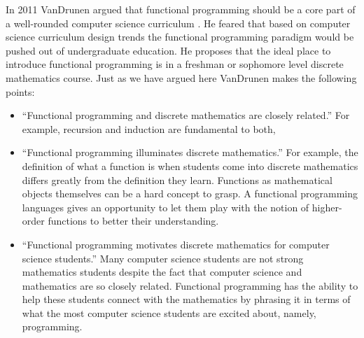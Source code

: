 In 2011 VanDrunen argued that functional programming should be a core
part of a well-rounded computer science curriculum
\cite{VanDrunen:2011}.  He feared that based on computer science
curriculum design trends the functional programming paradigm would be
pushed out of undergraduate education. He proposes that the ideal
place to introduce functional programming is in a freshman or
sophomore level discrete mathematics course.  Just as we have argued
here VanDrunen makes the following points:
\begin{itemize}
\item ``Functional programming and discrete mathematics are closely
  related.''  For example, recursion and induction are fundamental to
  both,
\item ``Functional programming illuminates discrete mathematics.'' For
  example, the definition of what a function is when students come
  into discrete mathematics differs greatly from the definition they
  learn.  Functions as mathematical objects themselves can be a hard
  concept to grasp.  A functional programming languages gives an
  opportunity to let them play with the notion of higher-order
  functions to better their understanding.
\item ``Functional programming motivates discrete mathematics for
  computer science students.'' Many computer science students are not
  strong mathematics students despite the fact that computer science
  and mathematics are so closely related.  Functional programming has
  the ability to help these students connect with the mathematics by
  phrasing it in terms of what the most computer science students are
  excited about, namely, programming.
\end{itemize}
